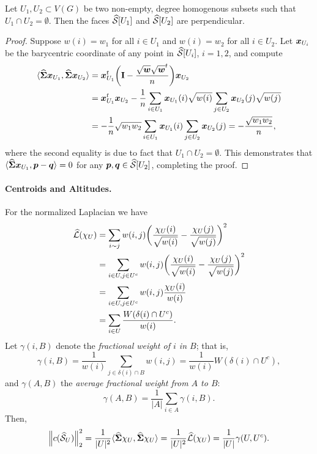 \begin{lemma}
	Let $U_1,U_2\subset V(G)$ be two non-empty, degree homogenous subsets such that $U_1\cap U_2=\emptyset$. Then the faces $\widehat{\mathcal{S}}[U_1]$ and $\widehat{\mathcal{S}}[U_2]$ are perpendicular. 
\end{lemma}
\begin{proof}
	Suppose $w(i)=w_1$ for all $i\in U_1$ and $w(i)=w_2$ for all $i\in U_2$. Let $\vb*{x}_{U_i}$ be the barycentric coordinate of any point in $\widehat{\mathcal{S}}[U_i]$, $i=1,2$, and compute 
	\begin{align*}
	\langle \widehat{\boldsymbol{\Sigma}}\vb*{x}_{U_1},\widehat{\boldsymbol{\Sigma}}\vb*{x}_{U_2}\rangle &= \vb*{x}_{U_1}^t \bigg(\vb{I}-\frac{\sqrt{\vb*{w}}\sqrt{\vb*{w}}^t}{n}\bigg) \vb*{x}_{U_2}\\
	&= \vb*{x}_{U_1}^t\vb*{x}_{U_2} - \frac{1}{n}\sum_{i\in U_1}\vb*{x}_{U_1}(i)\sqrt{w(i)}\sum_{j\in U_2}\vb*{x}_{U_2}(j) \sqrt{w(j)} \\
	&= -\frac{1}{n}\sqrt{w_1w_2}\sum_{i\in U_1}\vb*{x}_{U_1}(i) \sum_{j\in U_2}\vb*{x}_{U_2}(j) = -\frac{\sqrt{w_1w_2}}{n},
	\end{align*} 
	where the second equality is due to fact that $U_1\cap U_2=\emptyset$. This demonstrates that $\langle \widehat{\boldsymbol{\Sigma}}\vb*{x}_{U_1},\vb*{p}-\vb*{q}\rangle=0$ for any $\vb*{p},\vb*{q}\in\widehat{\mathcal{S}}[U_2]$, completing the proof. 
\end{proof}

\paragraph{Centroids and Altitudes.}
For the normalized Laplacian we have
\begin{align}
\widehat{\mathcal{L}}(\chi_U)&=\sum_{i\sim j}w(i,j) \bigg(\frac{\chi_U(i)}{\sqrt{w(i)}}-\frac{\chi_U(j)}{\sqrt{w(j)}}\bigg)^2 \notag \\
&= \sum_{i\in U,j\in U^c}w(i,j)\bigg(\frac{\chi_U(i)}{\sqrt{w(i)}}-\frac{\chi_U(j)}{\sqrt{w(j)}}\bigg)^2 \notag \\
&= \sum_{i\in U,j\in U^c}w(i,j)\frac{\chi_U(i)}{w(i)} \notag \\
&= \sum_{i\in U}\frac{W(\delta(i)\cap U^c)}{w(i)}. \label{eq:Lnf(chiU)}
\end{align}
Let $\gamma(i,B)$ denote the \emph{fractional weight of $i$ in $B$}; that is, \[\gamma(i,B)=\frac{1}{w(i)}\sum_{j\in\delta(i)\cap B} w(i,j)=\frac{1}{w(i)}W(\delta(i)\cap U^c),\]
and $\gamma(A,B)$ the \emph{average fractional weight from $A$ to $B$}: 
\[\gamma(A,B) =\frac{1}{|A|}\sum_{i\in A}\gamma(i,B). \]
Then, 
\begin{equation*}
\norm{c(\widehat{\mathcal{S}}_U)}_2^2 = \frac{1}{|U|^2}\langle \widehat{\boldsymbol{\Sigma}}\chi_U,\widehat{\boldsymbol{\Sigma}}\chi_U\rangle = \frac{1}{|U|^2}\widehat{\mathcal{L}}(\chi_U) = \frac{1}{|U|} \gamma(U,U^c).
\end{equation*}


